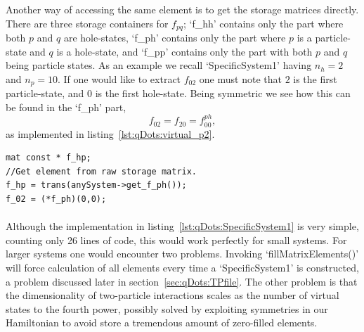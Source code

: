 Another way of accessing the same element is to get the storage matrices directly. There are three storage containers for $f_{pq}$; `f\_hh' contains only the part where both $p$ and $q$ are hole-states, `f\_ph' contains only the part where $p$ is a particle-state and $q$ is a hole-state, and `f\_pp' contains only the part with both $p$ and $q$ being particle states.
As an example we recall `SpecificSystem1' having $n_h = 2$ and $n_p = 10$.
If one would like to extract $f_{02}$ one must note that $2$ is the first particle-state, and $0$ is the first hole-state. 
Being symmetric we see how this can be found in the `f\_ph' part,
\begin{equation}
f_{02} = f_{20} = f^{ph}_{00},
\end{equation}
as implemented in listing~\ref{lst:qDots:virtual_p2}.
\begin{lstlisting}[float,label={lst:qDots:virtual_p2},caption={Continuing listing~\ref{lst:qDots:virtual_p1} extracting the same element, $f_{02}$, now through the raw storage matrix for $f$. This example assumes two occupied (hole) states, thus making index $2$ the first ($0$) particle state. With symmetric interaction matrices we expect $f_{ph} = f_{hp}^T$.},name={lst:qDots:virtual}]
mat const * f_hp;
//Get element from raw storage matrix.
f_hp = trans(anySystem->get_f_ph());
f_02 = (*f_ph)(0,0);
\end{lstlisting}

\paragraph*{}
Although the implementation in listing~\ref{lst:qDots:SpecificSystem1} is very simple, counting only 26 lines of code, this would work perfectly for small systems.
For larger systems one would encounter two problems.
Invoking `fillMatrixElements()' will force calculation of all elements every time a `SpecificSystem1' is constructed, a problem discussed later in section~\ref{sec:qDots:TPfile}.
The other problem is that the dimensionality of two-particle interactions scales as the number of virtual states to the fourth power, possibly solved by exploiting symmetries in our Hamiltonian to avoid store a tremendous amount of zero-filled elements.


